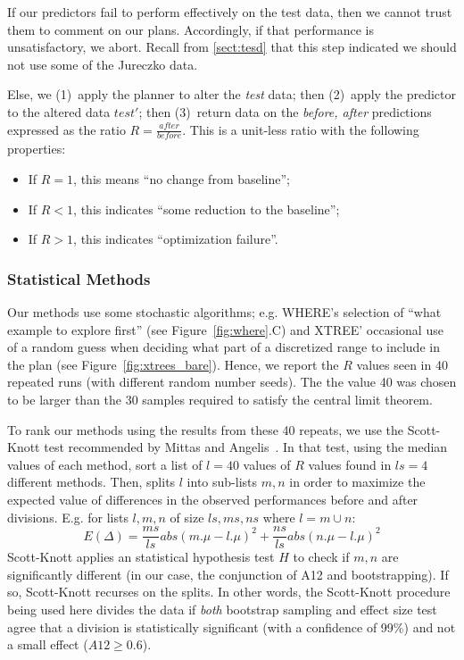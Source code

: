 \documentclass{sig-alternate}
\newcommand{\bi}{\begin{itemize}}
\newcommand{\ei}{\end{itemize}}
\newcommand{\tion}[1]{\textsection\ref{sect:#1}}
\newcommand{\fig}[1]{Figure~\ref{fig:#1}}
\begin{document}
If our { predictors} fail to perform effectively on the test data,
then we cannot trust them to comment on our plans. Accordingly,
if that performance is unsatisfactory, we abort. Recall from \tion{tesd} that this step indicated
we should not use some of the  Jureczko data.

Else, we (1)~apply the { planner} to alter the {\em test} data;
then (2)~apply the { predictor} to the altered data $test'$;
then (3)~return data on the {\em before, after} predictions expressed as the ratio $R=\frac{\mathit{after}}{\mathit{before}}$.
This is a unit-less ratio with the following properties:
\bi
\item If $R= 1$, this means  ``no change from baseline''; 
\item If $R < 1$, this indicates ``some reduction to the baseline'';
\item If $R > 1$, this indicates ``optimization failure''.
\ei
 \subsubsection{Statistical Methods}
 Our methods use some stochastic algorithms; e.g. WHERE's selection of ``what example to explore first'' (see \fig{where}.C) and
  XTREE' occasional use of a random guess when deciding what part of a discretized range to include in the plan
  (see \fig{xtrees_bare}). Hence, we report the $R$ values seen in 40 repeated runs
  (with different random number seeds).
The the value 40 was chosen to be  larger than the 30 samples  required
to satisfy the central limit theorem.

  To rank our methods using the results from these 40
  repeats, we use the Scott-Knott test recommended by Mittas and  Angelis~\cite{mittas13}. 
In that test, using the median values of each method,  
sort a list of  $l=40$ values of $R$ values found in  $ls=4$ different methods. 
Then,
splits $l$ into sub-lists $m,n$ in order to maximize the expected value of
 differences  in the observed performances
before and after divisions. E.g. for lists $l,m,n$ of size $ls,ms,ns$ where $l=m\cup n$:
 \[E(\Delta)=\frac{ms}{ls}abs(m.\mu - l.\mu)^2 + \frac{ns}{ls}abs(n.\mu - l.\mu)^2\]
Scott-Knott  applies an statistical  hypothesis test $H$ to check
if $m,n$ are significantly different  (in our case, the conjunction of A12 and bootstrapping). 
If so, Scott-Knott  recurses on the splits.
In other words, the Scott-Knott procedure being used here divides the data if \textit{both} bootstrap sampling and effect size test agree that a division is statistically significant (with a confidence of 99\%) and not a small effect ($A12 \ge 0.6$).
\end{document}
